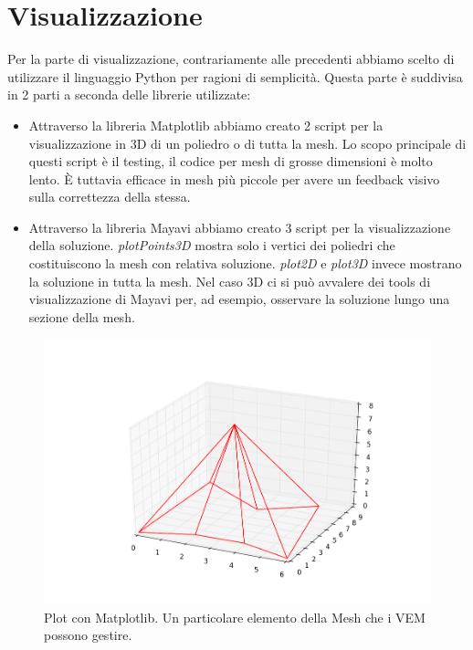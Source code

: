 \documentclass[oneside,12pt]{book}  %
\theoremstyle{plain}
\theoremstyle{definition}
\theoremstyle{remark}
\numberwithin{equation}{chapter} %
\begin{document}
\section{Visualizzazione }
\label{sec:visualizzazione}
Per la parte di visualizzazione, contrariamente alle precedenti
abbiamo scelto di utilizzare il linguaggio Python per ragioni di
semplicit\`a. Questa parte \`e suddivisa in 2 parti a seconda delle
librerie utilizzate:
\begin{itemize}
\item
Attraverso la libreria Matplotlib abbiamo creato 2 script per la
visualizzazione in 3D di un poliedro o di tutta la mesh. Lo scopo
principale di questi script \`e il testing, il codice per mesh di
grosse dimensioni \`e molto lento. \`E tuttavia efficace in mesh
pi\`u piccole per avere un feedback visivo sulla correttezza della
stessa. 
\item
Attraverso la libreria Mayavi abbiamo creato 3 script per la
visualizzazione della soluzione. 
\textit{plotPoints3D} mostra solo i vertici dei poliedri che
costituiscono la mesh con relativa soluzione. 
\textit{plot2D} e \textit{plot3D} invece mostrano la soluzione in
tutta la mesh. Nel caso 3D ci si pu\`o avvalere dei tools di
visualizzazione di Mayavi per, ad esempio, osservare la soluzione
lungo una sezione della mesh.
\end{itemize}

\begin{figure}[h]
\label{img:matplotlibPolyhedron}
\centering
\includegraphics[scale=0.4]{Immagini/Project/matplotlibTest5.png}
\caption{Plot con Matplotlib. Un particolare elemento della Mesh che i
  VEM possono gestire.}
\end{figure}
\end{document}
